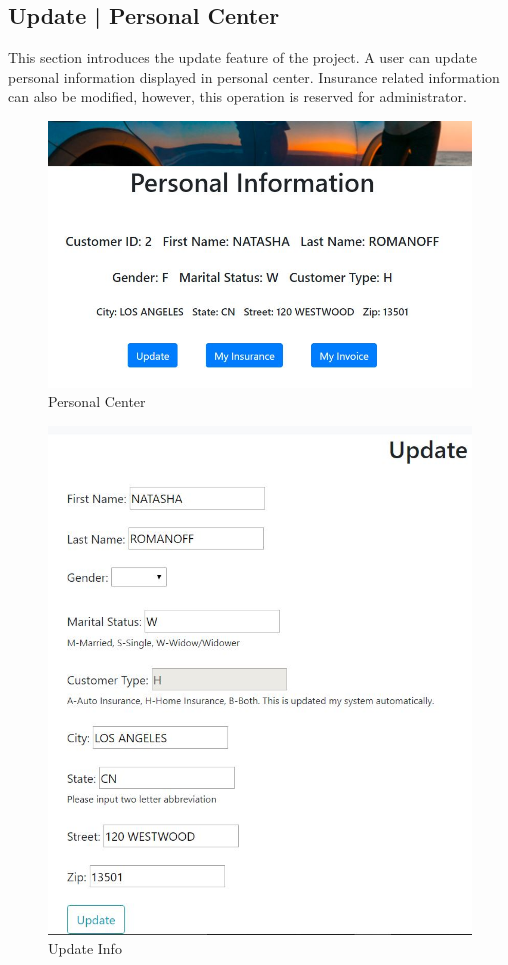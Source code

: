 \documentclass[12pt]{article}
\begin{document}
	\subsection{Update | Personal Center}  
	\qquad This section introduces the update feature of the project. A user can update personal information displayed in personal center. Insurance related information can also be modified, however, this operation is reserved for administrator.\\
	\begin{figure}[H]
		\centering
		\includegraphics[scale=0.6]{per}
		\caption{Personal Center}
	\end{figure}
	\newpage
	\begin{figure}[H]
		\centering
		\includegraphics[scale=0.8]{updateinfo}
		\caption{Update Info}
	\end{figure}
	\newpage
	
\end{document}
